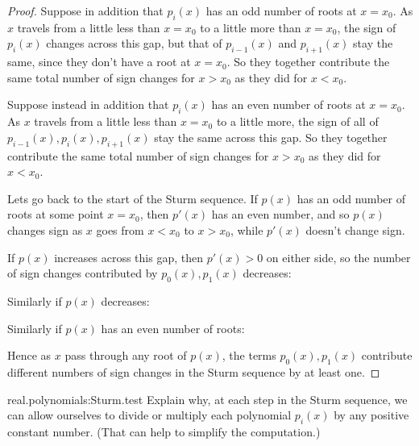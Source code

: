 \begin{proof}
Suppose in addition that \(p_i(x)\) has an odd number of roots at \(x=x_0\).
As \(x\) travels from a little less than \(x=x_0\) to a little more than \(x=x_0\), the sign of \(p_i(x)\) changes across this gap, but that of \(p_{i-1}(x)\) and \(p_{i+1}(x)\) stay the same, since they don't have a root at \(x=x_0\).
So they together contribute the same total number of sign changes for \(x>x_0\) as they did for \(x<x_0\).
\begin{center}
\qquad

\end{center}
Suppose instead in addition that \(p_i(x)\) has an even number of roots at \(x=x_0\).
As \(x\) travels from a little less than \(x=x_0\) to a little more, the sign of all of \(p_{i-1}(x), p_i(x), p_{i+1}(x)\) stay the same across this gap.
So they together contribute the same total number of sign changes for \(x>x_0\) as they did for \(x<x_0\).
\begin{center}
\qquad

\end{center}
Lets go back to the start of the Sturm sequence.
If \(p(x)\) has an odd number of roots at some point \(x=x_0\), then \(p'(x)\) has an even number, and so \(p(x)\) changes sign as \(x\) goes from \(x < x_0\) to \(x > x_0\), while \(p'(x)\) doesn't change sign.
\begin{center}
\qquad

\end{center}
If \(p(x)\) increases across this gap, then \(p'(x)>0\) on either side, so the number of sign changes contributed by \(p_0(x), p_1(x)\) decreases:
\begin{center}

\end{center}
Similarly if \(p(x)\) decreases:
\begin{center}

\end{center}
Similarly if \(p(x)\) has an even number of roots:
\begin{center}
\qquad

\end{center}
Hence as \(x\) pass through any root of \(p(x)\), the terms \(p_0(x), p_1(x)\) contribute different numbers of sign changes in the Sturm sequence by at least one.
\end{proof}
\begin{problem}{real.polynomials:Sturm.test}
Explain why, at each step in the Sturm sequence, we can allow ourselves to divide or multiply each polynomial \(p_i(x)\) by any positive constant number. (That can help to simplify the computation.)
\end{problem}
